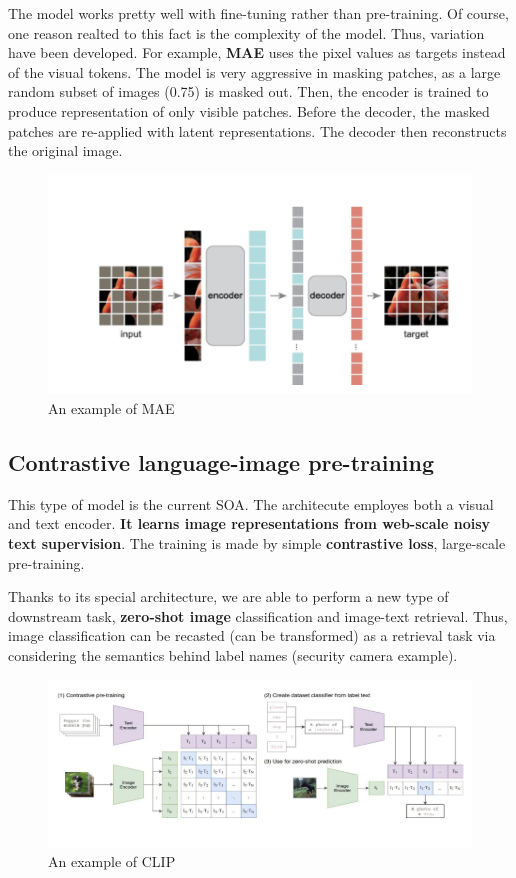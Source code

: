 The model works pretty well with fine-tuning rather than pre-training. Of course, one reason realted to this fact is the complexity of the model. Thus, variation have been developed. For example, \textbf{MAE} uses the pixel values as targets instead of the visual tokens. The model is very aggressive in masking patches, as a large random subset of images (0.75) is masked out. Then, the encoder is trained to produce representation of only visible patches. Before the decoder, the masked patches are re-applied with latent representations. The decoder then reconstructs the original image.

\begin{figure}[H]
    \centering
    \includegraphics[width=1\linewidth]{tikz/MAE.png}
    \caption{An example of MAE}
    \label{fig:MAE}
\end{figure}

\subsection{Contrastive language-image pre-training}

This type of model is the current SOA. The architecute employes both a visual and text encoder. \textbf{It learns image representations from web-scale noisy text supervision}. The training is made by simple \textbf{contrastive loss}, large-scale pre-training.

Thanks to its special architecture, we are able to perform a new type of downstream task, \textbf{zero-shot image} classification and image-text retrieval. Thus, image classification can be recasted (can be transformed) as a retrieval task via considering the semantics behind label names (security camera example).


\begin{figure}[H]
    \centering
    \includegraphics[width=1\linewidth]{tikz/CLIP.png}
    \caption{An example of CLIP}
    \label{fig:CLIP}
\end{figure}

